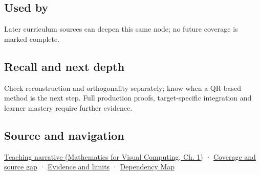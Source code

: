 \subsection{Used by}\label{appendix-c39f1ed34271-used-by}

\hypertarget{appendix-c39f1ed34271-used-by}{}

Later curriculum sources can deepen this same node; no future coverage is marked complete.

\subsection{Recall and next depth}\label{appendix-c39f1ed34271-recall-and-next-depth}

\hypertarget{appendix-c39f1ed34271-recall-and-next-depth}{}

Check reconstruction and orthogonality separately; know when a QR-based method is the next step. Full production proofs, target-specific integration and learner mastery require further evidence.

\subsection{Source and navigation}\label{appendix-c39f1ed34271-source-and-navigation}

\hypertarget{appendix-c39f1ed34271-source-and-navigation}{}

\href{../02-Mathematics-for-Visual-Computing/main.pdf\#nameddest=01-foundations-i-ch017-orthonormal-frames-make-reconstruction-simple}{Teaching narrative (Mathematics for Visual Computing, Ch. 1)} · \hyperref[appendix-fd090d982a15-phase-6---parts-501-600]{Coverage and source gap} · \hyperref[appendix-a103e7846d21-phase-6---source-analysis-and-verification]{Evidence and limits} · \hyperref[appendix-4ad47bdd269a]{Dependency Map}
